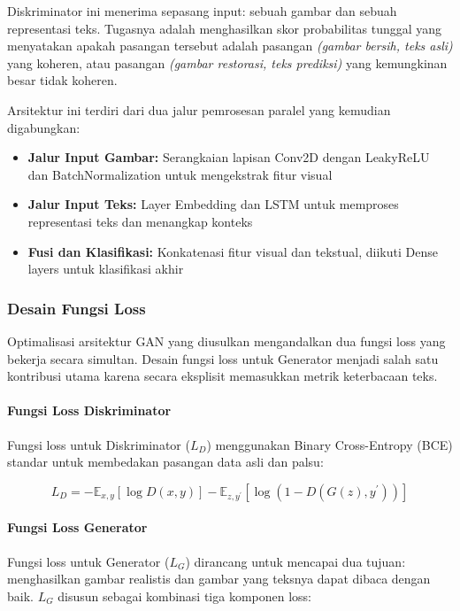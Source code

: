 \documentclass[12pt,a4paper]{article}
\begin{document}
Diskriminator ini menerima sepasang input: sebuah gambar dan sebuah representasi teks. Tugasnya adalah menghasilkan skor probabilitas tunggal yang menyatakan apakah pasangan tersebut adalah pasangan \textit{(gambar bersih, teks asli)} yang koheren, atau pasangan \textit{(gambar restorasi, teks prediksi)} yang kemungkinan besar tidak koheren.

Arsitektur ini terdiri dari dua jalur pemrosesan paralel yang kemudian digabungkan:

\begin{itemize}
    \item \textbf{Jalur Input Gambar:} Serangkaian lapisan Conv2D dengan LeakyReLU dan BatchNormalization untuk mengekstrak fitur visual
    \item \textbf{Jalur Input Teks:} Layer Embedding dan LSTM untuk memproses representasi teks dan menangkap konteks
    \item \textbf{Fusi dan Klasifikasi:} Konkatenasi fitur visual dan tekstual, diikuti Dense layers untuk klasifikasi akhir
\end{itemize}

\subsubsection{Desain Fungsi Loss} %

Optimalisasi arsitektur GAN yang diusulkan mengandalkan dua fungsi loss yang bekerja secara simultan. Desain fungsi loss untuk Generator menjadi salah satu kontribusi utama karena secara eksplisit memasukkan metrik keterbacaan teks.

\paragraph{Fungsi Loss Diskriminator}
Fungsi loss untuk Diskriminator ($L_D$) menggunakan Binary Cross-Entropy (BCE) standar untuk membedakan pasangan data asli dan palsu:

\begin{equation}
L_D = -\mathbb{E}_{x,y}[\log D(x, y)] - \mathbb{E}_{z,y^{\prime}}[\log(1 - D(G(z), y^{\prime}))]
\end{equation}

\paragraph{Fungsi Loss Generator}
Fungsi loss untuk Generator ($L_G$) dirancang untuk mencapai dua tujuan: menghasilkan gambar realistis dan gambar yang teksnya dapat dibaca dengan baik. $L_G$ disusun sebagai kombinasi tiga komponen loss:
\end{document}
